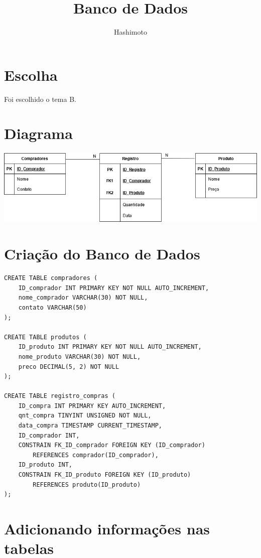 \documentclass{article}
\begin{document}
\title{Banco de Dados}
\author{Hashimoto}
\date{}
\maketitle

\section*{Escolha}

Foi escolhido o tema B.

\section*{Diagrama}

\includegraphics[width=\textwidth]{imgs/Diagram.png}

\newpage
\section*{Criação do Banco de Dados}

\begin{verbatim}
CREATE TABLE compradores (
    ID_comprador INT PRIMARY KEY NOT NULL AUTO_INCREMENT,
    nome_comprador VARCHAR(30) NOT NULL,
    contato VARCHAR(50)
);

CREATE TABLE produtos (
    ID_produto INT PRIMARY KEY NOT NULL AUTO_INCREMENT,
    nome_produto VARCHAR(30) NOT NULL,
    preco DECIMAL(5, 2) NOT NULL
);

CREATE TABLE registro_compras (
    ID_compra INT PRIMARY KEY AUTO_INCREMENT,
    qnt_compra TINYINT UNSIGNED NOT NULL,
    data_compra TIMESTAMP CURRENT_TIMESTAMP,
    ID_comprador INT,
    CONSTRAIN FK_ID_comprador FOREIGN KEY (ID_comprador)
        REFERENCES comprador(ID_comprador),
    ID_produto INT,
    CONSTRAIN FK_ID_produto FOREIGN KEY (ID_produto)
        REFERENCES produto(ID_produto)
);
\end{verbatim}

\newpage
\section*{Adicionando informações nas tabelas}
\end{document}
